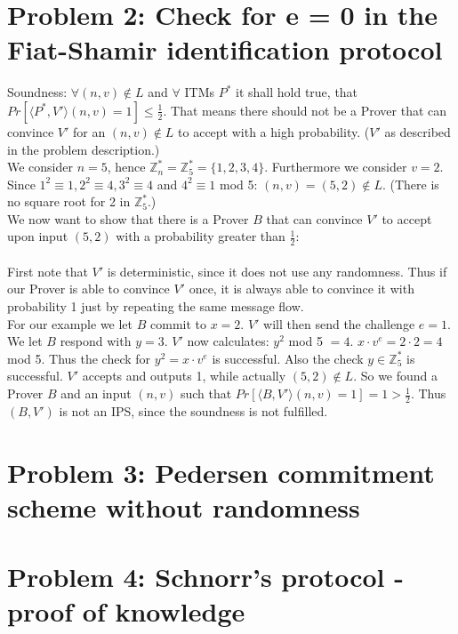 \documentclass[12pt,pdftex,a4paper]{article}
\begin{document}
\section*{Problem 2: Check for e = 0 in the Fiat-Shamir identification protocol}
Soundness: $\forall	(n, v) \notin L$ and $\forall$ ITMs $P^*$ it shall hold true, that $Pr[\langle P^*, V'\rangle (n, v) = 1]\leq \frac{1}{2}$. That means there should not be a Prover that can convince $V'$ for an $(n, v)\notin L$ to accept with a high probability. ($V'$ as described in the problem description.)\\
We consider $n=5$, hence $\mathbb{Z}_{n}^* = \mathbb{Z}_{5}^* = \{1, 2, 3, 4\}$. Furthermore we consider $v = 2$. Since $1^2\equiv 1, 2^2\equiv 4, 3^2\equiv 4$ and $4^2\equiv 1$ mod 5: $(n, v) = (5, 2) \notin L$. (There is no square root for 2 in $\mathbb{Z}_5^*$.)\\
We now want to show that there is a Prover $B$ that can convince $V'$ to accept upon input $(5, 2)$ with a probability greater than $\frac{1}{2}$:\\~\\
First note that $V'$ is deterministic, since it does not use any randomness. Thus if our Prover is able to convince $V'$ once, it is always able to convince it with probability 1 just by repeating the same message flow.\\
For our example we let $B$ commit to $x=2$. $V'$ will then send the challenge $e=1$. We let $B$ respond with $y=3$. $V'$ now calculates: $y^2$ mod 5 $=4$. $x\cdot v^e = 2\cdot 2 = 4$ mod 5. Thus the check for $y^2 = x\cdot v^e$ is successful. Also the check $y\in \mathbb{Z}_5^*$ is successful. $V'$ accepts and outputs 1, while actually $(5, 2) \notin L$.
So we found a Prover $B$ and an input $(n, v)$ such that $Pr[\langle B, V'\rangle (n, v) = 1]=1>\frac{1}{2}$. Thus $(B, V')$ is not an IPS, since the soundness is not fulfilled.

\section*{Problem 3: Pedersen commitment scheme without randomness}

\section*{Problem 4: Schnorr’s protocol - proof of knowledge}
\end{document}

